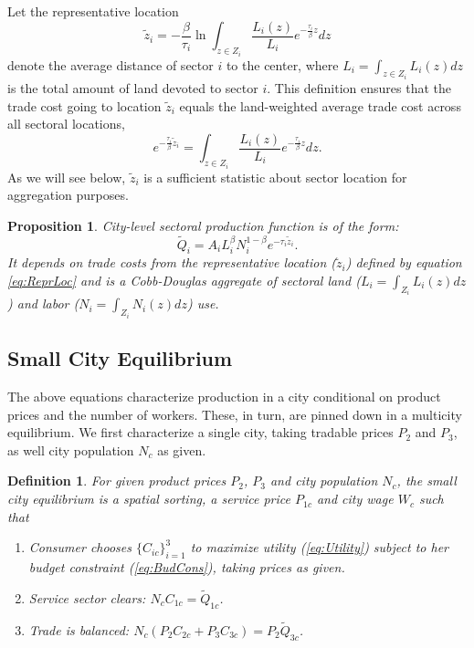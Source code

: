 \documentclass[12pt]{article}
\newtheorem{definition}{Definition}
\newtheorem{proposition}{Proposition}
\begin{document}
Let the representative location
\begin{equation}
\label{eq:ReprLoc}
\tilde z_i = -
\frac{\beta}{\tau_i}
\ln\int_{z\in Z_i} \frac{L_i(z)}{L_i}e^{-\frac{\tau_i}{\beta} z}dz
\end{equation}
denote the average distance of sector $i$ to the center, where $L_i=\int_{z\in Z_i} L_i(z)dz$ is the total amount of land devoted to sector $i$. This definition ensures that the trade cost going to location $\tilde z_i$ equals the land-weighted average trade cost across all sectoral locations,
\[
e^{-\frac{\tau_i}{\beta} \tilde z_i} = \int_{z\in Z_i} \frac{L_i(z)}{L_i}e^{-\frac{\tau_i}{\beta} z}dz.
\]
As we will see below, $\tilde z_i$ is a sufficient statistic about sector location for aggregation purposes. %

\begin{proposition}\label{prop:aggregation}
City-level sectoral production function is of the form:
\begin{equation}
\tilde Q_i =
A_iL_i^{\beta}N_i^{1-\beta}
 e^{-\tau_i\tilde z_i}.
\end{equation}
It depends on trade costs from the representative location ($\tilde{z}_i$) defined by equation \eqref{eq:ReprLoc} and is a Cobb-Douglas aggregate of sectoral land ($L_i=\int_{Z_i}L_i(z)dz$) and labor ($N_i=\int_{Z_i}N_i(z)dz$) use.
\end{proposition}

\subsection{Small City Equilibrium}
The above equations characterize production in a city conditional on product prices and the number of workers. These, in turn, are pinned down in a multicity equilibrium. We first characterize a single city, taking tradable prices $P_2$ and $P_3$, as well city population $N_c$ as given. 

\begin{definition}
For given product prices $P_2$, $P_3$ and city population $N_c$, 
the \emph{small city equilibrium} is a spatial sorting, a service price $P_{1c}$ and city wage $W_c$ such that
\begin{enumerate}
    \item Consumer chooses $\{C_{ic}\}_{i=1}^3$ to maximize utility (\ref{eq:Utility}) subject to her budget constraint (\ref{eq:BudCons}), taking prices as given.
    \item Service sector clears: $N_c C_{1c}=\tilde Q_{1c}$.
    \item Trade is balanced: $N_c(P_2C_{2c} + P_3 C_{3c}) = P_2 \tilde Q_{3c}$.
\end{enumerate}
\end{definition}
\end{document}
